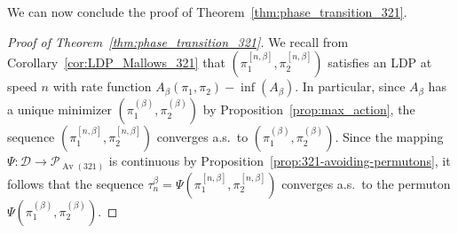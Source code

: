 \documentclass[a4paper,11pt]{amsart}
\newcommand{\ee}{\textup{e}}
\DeclareMathOperator{\Av}{Av}
\newcommand{\PAvTDU}{\mathcal P_{\Av(321)}}
\newtheorem{thm}{Theorem}
\theoremstyle{definition}
\begin{document}
We can now conclude the proof of Theorem~\ref{thm:phase_transition_321}. 


\begin{proof}[Proof of Theorem~\ref{thm:phase_transition_321}]
    We recall from Corollary~\ref{cor:LDP_Mallows_321} that $(\pi_1^{[n,\beta]}, \pi_2^{[n,\beta]})$ satisfies an LDP at speed $n$ with rate function $A_{\beta}(\pi_1,\pi_2)- \inf(A_{\beta})$.
    In particular, since $A_{\beta}$ has a unique minimizer $(\pi_1^{(\beta)}, \pi_2^{(\beta)})$ by Proposition~\ref{prop:max_action}, the sequence $(\pi_1^{[n,\beta]}, \pi_2^{[n,\beta]})$ converges a.s.~to $(\pi_1^{(\beta)}, \pi_2^{(\beta)})$.
    Since the mapping $\Psi : \mathcal D \to \PAvTDU$ is continuous by Proposition~\ref{prop:321-avoiding-permutons}, it follows that the sequence $\tau_n^{\beta} = \Psi\left(\pi_1^{[n,\beta]}, \pi_2^{[n,\beta]} \right)$ converges a.s.~to the permuton $\Psi\left( \pi_1^{(\beta)}, \pi_2^{(\beta)} \right)$.
    

\end{proof}
\end{document}
